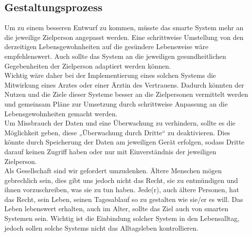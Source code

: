 \subsection{Gestaltungsprozess}
Um zu einem besseren Entwurf zu kommen, müsste das smarte System mehr an die jeweilige Zielperson angepasst werden. Eine schrittweise Umstellung von den derzeitigen Lebensgewohnheiten auf die gesündere Lebensweise wäre empfehlenswert. Auch sollte das System an die jeweiligen gesundheitlichen Gegebenheiten der Zielperson adaptiert werden können. \\
Wichtig wäre daher bei der Implementierung eines solchen Systems die Mitwirkung eines Arztes oder einer Ärztin des Vertrauens. Dadurch könnten der Nutzen und die Ziele dieser Systeme besser an die Zielpersonen vermittelt werden und gemeinsam Pläne zur Umsetzung durch schrittweise Anpassung an die Lebensgewohnheiten gemacht werden. \\
Um Missbrauch der Daten und eine Überwachung zu verhindern, sollte es die Möglichkeit geben, diese „Überwachung durch Dritte“ zu deaktivieren. Dies könnte durch Speicherung der Daten am jeweiligen Gerät erfolgen, sodass Dritte darauf keinen Zugriff haben oder nur mit Einverständnis der jeweiligen Zielperson. \\
Als Gesellschaft sind wir gefordert umzudenken. Ältere Menschen mögen gebrechlich sein, dies gibt uns jedoch nicht das Recht, sie zu entmündigen und ihnen vorzuschreiben, was sie zu tun haben. Jede(r), auch ältere Personen, hat das Recht, sein Leben, seinen Tagesablauf so zu gestalten wie sie/er es will. Das Leben lebenswert erhalten, auch im Alter, sollte das Ziel auch von smarten Systemen sein. Wichtig ist die Einbindung solcher System in den Lebensalltag, jedoch sollen solche Systems nicht das Alltagsleben kontrollieren. 